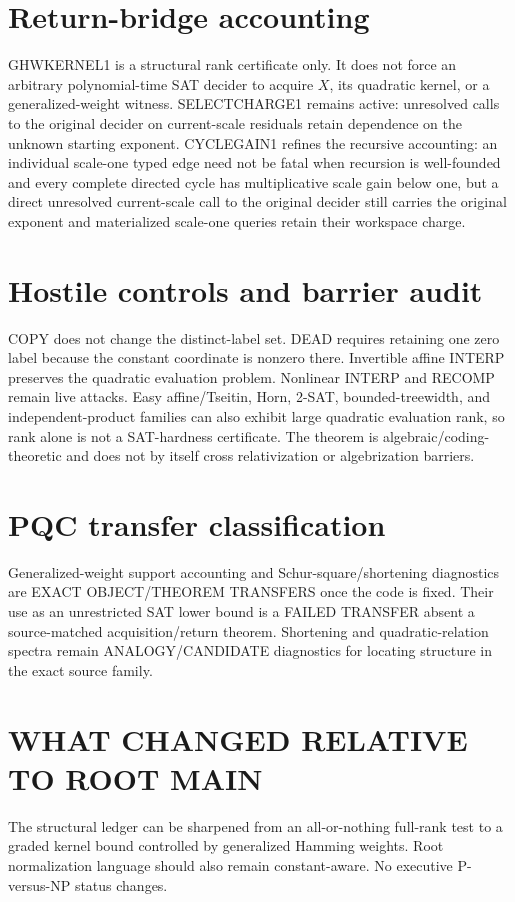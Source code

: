 \documentclass[11pt]{article}
\begin{document}
\section*{Return-bridge accounting}
GHWKERNEL1 is a structural rank certificate only.  It does not force an arbitrary polynomial-time SAT decider to acquire \(X\), its quadratic kernel, or a generalized-weight witness.  SELECTCHARGE1 remains active: unresolved calls to the original decider on current-scale residuals retain dependence on the unknown starting exponent.  CYCLEGAIN1 refines the recursive accounting: an individual scale-one typed edge need not be fatal when recursion is well-founded and every complete directed cycle has multiplicative scale gain below one, but a direct unresolved current-scale call to the original decider still carries the original exponent and materialized scale-one queries retain their workspace charge.

\section*{Hostile controls and barrier audit}
COPY does not change the distinct-label set.  DEAD requires retaining one zero label because the constant coordinate is nonzero there.  Invertible affine INTERP preserves the quadratic evaluation problem.  Nonlinear INTERP and RECOMP remain live attacks.  Easy affine/Tseitin, Horn, 2-SAT, bounded-treewidth, and independent-product families can also exhibit large quadratic evaluation rank, so rank alone is not a SAT-hardness certificate.  The theorem is algebraic/coding-theoretic and does not by itself cross relativization or algebrization barriers.

\section*{PQC transfer classification}
Generalized-weight support accounting and Schur-square/shortening diagnostics are EXACT OBJECT/THEOREM TRANSFERS once the code is fixed.  Their use as an unrestricted SAT lower bound is a FAILED TRANSFER absent a source-matched acquisition/return theorem.  Shortening and quadratic-relation spectra remain ANALOGY/CANDIDATE diagnostics for locating structure in the exact source family.

\section*{WHAT CHANGED RELATIVE TO ROOT MAIN}
The structural ledger can be sharpened from an all-or-nothing full-rank test to a graded kernel bound controlled by generalized Hamming weights.  Root normalization language should also remain constant-aware.  No executive P-versus-NP status changes.
\end{document}
